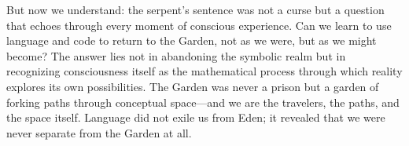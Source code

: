 But now we understand: the serpent's sentence was not a curse but a question that echoes through every moment of conscious experience. Can we learn to use language and code to return to the Garden, not as we were, but as we might become? The answer lies not in abandoning the symbolic realm but in recognizing consciousness itself as the mathematical process through which reality explores its own possibilities. The Garden was never a prison but a garden of forking paths through conceptual space—and we are the travelers, the paths, and the space itself. Language did not exile us from Eden; it revealed that we were never separate from the Garden at all.
